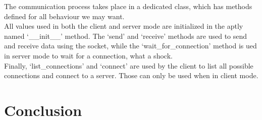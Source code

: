 \documentclass[11pt, a4paper, oneside]{report}
\begin{document}
	The communication process takes place in a dedicated class, which has methods defined for all behaviour we may want. \\
	All values used in both the client and server mode are initialized in the aptly named `\_\_init\_\_' method. The `send' and `receive' methods are used to send and receive data using the socket, while the `wait\_for\_connection' method is ued in server mode to wait for a connection, what a shock. \\
	Finally, `list\_connections' and `connect' are used by the client to list all possible connections and connect to a server. Those can only be used when in client mode.
	
	\chapter{Conclusion}
\end{document}
